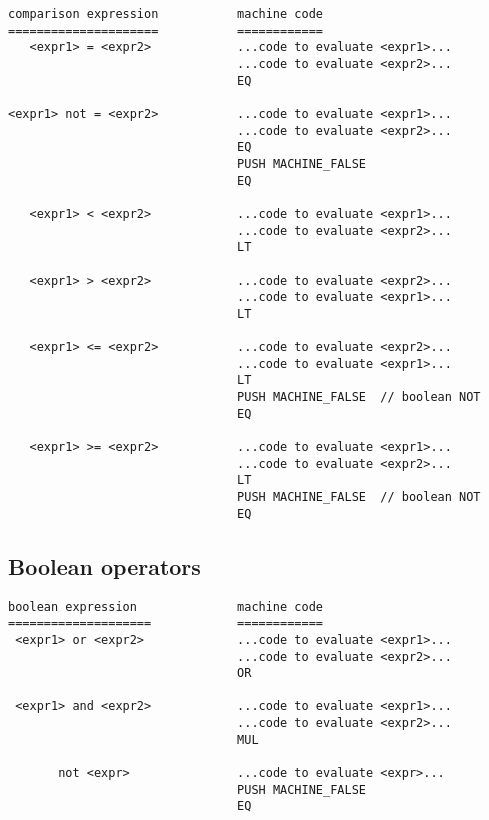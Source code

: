 \documentclass[11pt]{article}
\begin{document}
\begin{verbatim}
comparison expression           machine code
=====================           ============
   <expr1> = <expr2>            ...code to evaluate <expr1>...
                                ...code to evaluate <expr2>...
                                EQ
                                
<expr1> not = <expr2>           ...code to evaluate <expr1>...
                                ...code to evaluate <expr2>...
                                EQ
                                PUSH MACHINE_FALSE
                                EQ
                                
   <expr1> < <expr2>            ...code to evaluate <expr1>...
                                ...code to evaluate <expr2>...
                                LT
                                
   <expr1> > <expr2>            ...code to evaluate <expr2>...
                                ...code to evaluate <expr1>...
                                LT
                                
   <expr1> <= <expr2>           ...code to evaluate <expr2>...
                                ...code to evaluate <expr1>...
                                LT
                                PUSH MACHINE_FALSE  // boolean NOT
                                EQ
                                
   <expr1> >= <expr2>           ...code to evaluate <expr1>...
                                ...code to evaluate <expr2>...
                                LT
                                PUSH MACHINE_FALSE  // boolean NOT
                                EQ
\end{verbatim}

\subsection{Boolean operators}

\begin{verbatim}
boolean expression              machine code
====================            ============
 <expr1> or <expr2>             ...code to evaluate <expr1>...
                                ...code to evaluate <expr2>...
                                OR
                                  
 <expr1> and <expr2>            ...code to evaluate <expr1>...
                                ...code to evaluate <expr2>...
                                MUL
                                  
       not <expr>               ...code to evaluate <expr>...
                                PUSH MACHINE_FALSE
                                EQ
\end{verbatim}
\end{document}
